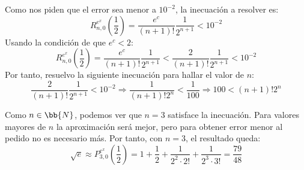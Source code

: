 \begin{ejercicio}
\begin{enumerate}
        Como nos piden que el error sea menor a $10^{-2}$, la inecuación a resolver es:
        \begin{equation*}
            R_{n,0}^{e^x}\left(\frac{1}{2}\right) = \frac{e^c}{(n+1)!}\frac{1}{2^{n+1}} < 10^{-2}
        \end{equation*}
        Usando la condición de que $e^c < 2$:
        \begin{equation*}
            R_{n,0}^{e^x}\left(\frac{1}{2}\right) = \frac{e^c}{(n+1)!}\frac{1}{2^{n+1}} < \frac{2}{(n+1)!}\frac{1}{2^{n+1}}  < 10^{-2}
        \end{equation*}
        Por tanto, resuelvo la siguiente inecuación para hallar el valor de $n$:
        \begin{equation*}
            \frac{2}{(n+1)!}\frac{1}{2^{n+1}}  < 10^{-2} \Longrightarrow \frac{1}{(n+1)!2^n} < \frac{1}{100} \Longrightarrow 100 < (n+1)!2^n
        \end{equation*}

        Como $n\in \bb{N}$, podemos ver que $n=3$ satisface la inecuación. Para valores mayores de $n$ la aproximación será mejor, pero para obtener error menor al pedido no es necesario más. Por tanto, con $n=3$, el resultado queda:
        $$\sqrt{e}\approx P_{3, 0}^{e^x}\left(\frac{1}{2}\right) = 1 + \frac{1}{2} + \frac{1}{2^2 \cdot 2!} + \frac{1}{2^3 \cdot 3!} = \frac{79}{48}$$
    \end{enumerate}
\end{ejercicio}

